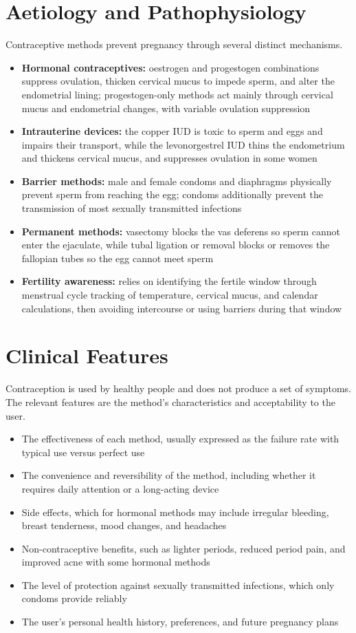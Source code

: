 \section*{Aetiology and Pathophysiology}
Contraceptive methods prevent pregnancy through several distinct mechanisms.
\begin{itemize}
    \item \textbf{Hormonal contraceptives:} oestrogen and progestogen combinations suppress ovulation, thicken cervical mucus to impede sperm, and alter the endometrial lining; progestogen-only methods act mainly through cervical mucus and endometrial changes, with variable ovulation suppression
    \item \textbf{Intrauterine devices:} the copper IUD is toxic to sperm and eggs and impairs their transport, while the levonorgestrel IUD thins the endometrium and thickens cervical mucus, and suppresses ovulation in some women
    \item \textbf{Barrier methods:} male and female condoms and diaphragms physically prevent sperm from reaching the egg; condoms additionally prevent the transmission of most sexually transmitted infections
    \item \textbf{Permanent methods:} vasectomy blocks the vas deferens so sperm cannot enter the ejaculate, while tubal ligation or removal blocks or removes the fallopian tubes so the egg cannot meet sperm
    \item \textbf{Fertility awareness:} relies on identifying the fertile window through menstrual cycle tracking of temperature, cervical mucus, and calendar calculations, then avoiding intercourse or using barriers during that window
\end{itemize}

\section*{Clinical Features}
Contraception is used by healthy people and does not produce a set of symptoms. The relevant features are the method's characteristics and acceptability to the user.
\begin{itemize}
    \item The effectiveness of each method, usually expressed as the failure rate with typical use versus perfect use
    \item The convenience and reversibility of the method, including whether it requires daily attention or a long-acting device
    \item Side effects, which for hormonal methods may include irregular bleeding, breast tenderness, mood changes, and headaches
    \item Non-contraceptive benefits, such as lighter periods, reduced period pain, and improved acne with some hormonal methods
    \item The level of protection against sexually transmitted infections, which only condoms provide reliably
    \item The user's personal health history, preferences, and future pregnancy plans
\end{itemize}

